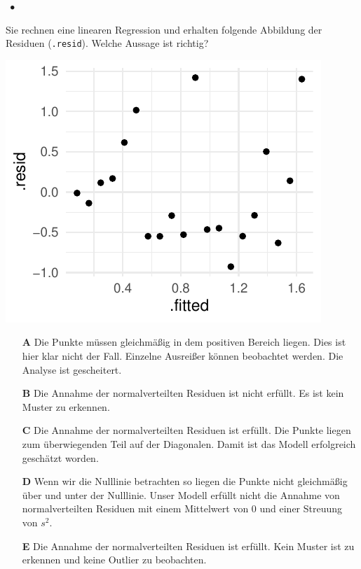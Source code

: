 \documentclass[a4paper, 9pt]{scrartcl}\usepackage[]{graphicx}\usepackage[]{xcolor}
\makeatletter
\def\maxwidth{ %
  \ifdim\Gin@nat@width>\linewidth
    \linewidth
  \else
    \Gin@nat@width
  \fi
}
\makeatother
\begin{document}
\ifcollection
\begin{flushright}
\tiny\vspace{-2Ex}
\textbf{\examinhaltstart}
\exammodulestatversuch $\;\bullet$
\exammodulebiostat
\vspace{-1Ex}
\end{flushright}
\fi




Sie rechnen eine linearen Regression und erhalten folgende Abbildung der Residuen (\texttt{.resid}). Welche Aussage ist richtig?



{\centering \includegraphics[width=\maxwidth]{img/mc-regression-06-a-1} 

}







\begin{enumerate}
\item [\textbf{A} \msquare] Die Punkte müssen gleichmäßig in dem positiven Bereich liegen. Dies ist hier klar nicht der Fall. Einzelne Ausreißer können beobachtet werden. Die Analyse ist gescheitert.
\item [\textbf{B} \msquare] Die Annahme der normalverteilten Residuen ist nicht erfüllt. Es ist kein Muster zu erkennen.
\item [\textbf{C} \msquare] Die Annahme der normalverteilten Residuen ist erfüllt. Die Punkte liegen zum überwiegenden Teil auf der Diagonalen. Damit ist das Modell erfolgreich geschätzt worden.
\item [\textbf{D} \msquare] Wenn wir die Nulllinie betrachten so liegen die Punkte nicht gleichmäßig über und unter der Nulllinie. Unser Modell erfüllt nicht die Annahme von normalverteilten Residuen mit einem Mittelwert von 0 und einer Streuung von $s^2$.
\item [\textbf{E} \msquare] Die Annahme der normalverteilten Residuen ist erfüllt. Kein Muster ist zu erkennen und keine Outlier zu beobachten.
\end{enumerate}
\end{document}
